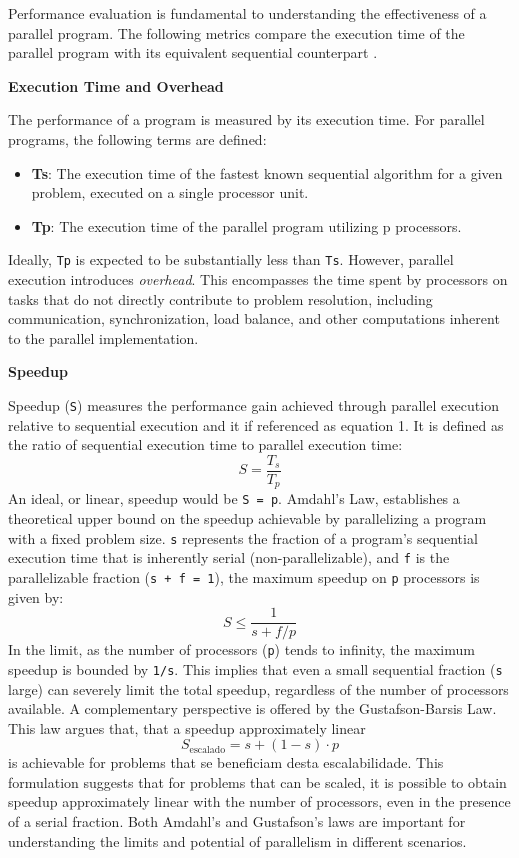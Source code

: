 
Performance evaluation is fundamental to understanding the effectiveness of a parallel program. The following metrics compare the execution time of the parallel program with its equivalent sequential counterpart \cite{Grama2003}.

\textbf{Execution Time and Overhead}

The performance of a program is measured by its execution time. For parallel programs, the following terms are defined:
\begin{itemize}
    \item \textbf{Ts}: The execution time of the fastest known sequential algorithm for a given problem, executed on a single processor unit.
    \item \textbf{Tp}: The execution time of the parallel program utilizing p processors.
\end{itemize}

Ideally, \texttt{Tp} is expected to be substantially less than \texttt{Ts}. However, parallel execution introduces \textit{overhead}. This encompasses the time spent by processors on tasks that do not directly contribute to problem resolution, including communication, synchronization, load balance, and other computations inherent to the parallel implementation.

\textbf{Speedup}

Speedup (\texttt{S}) measures the performance gain achieved through parallel execution relative to sequential execution and it if referenced as equation 1. It is defined as the ratio of sequential execution time to parallel execution time:
\[ S = \frac{T_s}{T_p} \]
An ideal, or linear, speedup would be \texttt{S = p}. Amdahl's Law, establishes a theoretical upper bound on the speedup achievable by parallelizing a program with a fixed problem size. \texttt{s} represents the fraction of a program's sequential execution time that is inherently serial (non-parallelizable), and \texttt{f} is the parallelizable fraction (\texttt{s + f = 1}), the maximum speedup on \texttt{p} processors is given by:
\[ S \leq \frac{1}{s + f/p} \]
In the limit, as the number of processors (\texttt{p}) tends to infinity, the maximum speedup is bounded by \texttt{1/s}. This implies that even a small sequential fraction (\texttt{s} large) can severely limit the total speedup, regardless of the number of processors available. A complementary perspective is offered by the Gustafson-Barsis Law. This law argues that, that a speedup approximately linear
\[ S_{\text{escalado}} = s + (1-s) \cdot p \]
is achievable for problems that se beneficiam desta escalabilidade. This formulation suggests that for problems that can be scaled, it is possible to obtain speedup approximately linear with the number of processors, even in the presence of a serial fraction. Both Amdahl's and Gustafson's laws are important for understanding the limits and potential of parallelism in different scenarios.

